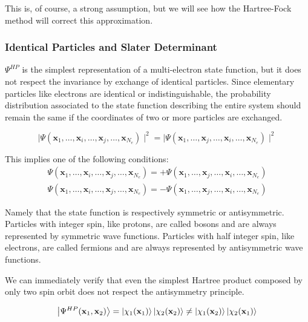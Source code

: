 \documentclass[a4paper,12pt]{article}
\begin{document}
This is, of course, a strong assumption, but we will see how the Hartree-Fock method will correct this approximation.



\subsubsection{Identical Particles and Slater Determinant}

$\Psi^{HP}$ is the simplest representation of a multi-electron state function, but it does not respect the invariance by exchange of identical particles.
Since elementary particles like electrons are identical or indistinguishable, the probability distribution associated to the state function describing the entire system should remain the same if the coordinates of two or more particles are exchanged.

\begin{equation}
	\mid \Psi(\mathbf{x}_1,\dots,\mathbf{x}_i,\dots,\mathbf{x}_j,\dots,\mathbf{x}_{N_e}) \mid^2 = \mid \Psi(\mathbf{x}_1,\dots,\mathbf{x}_j,\dots,\mathbf{x}_i,\dots,\mathbf{x}_{N_e}) \mid^2
\end{equation}

This implies one of the following conditions:
\begin{align}
	\Psi(\mathbf{x}_1,\dots,\mathbf{x}_i,\dots,\mathbf{x}_j,\dots,\mathbf{x}_{N_e}) = 
		+\Psi(\mathbf{x}_1,\dots,\mathbf{x}_j,\dots,\mathbf{x}_i,\dots,\mathbf{x}_{N_e})\\
	\Psi(\mathbf{x}_1,\dots,\mathbf{x}_i,\dots,\mathbf{x}_j,\dots,\mathbf{x}_{N_e}) = 
		-\Psi(\mathbf{x}_1,\dots,\mathbf{x}_j,\dots,\mathbf{x}_i,\dots,\mathbf{x}_{N_e}) 
\end{align}

Namely that the state function is respectively symmetric or antisymmetric.
Particles with integer spin, like protons, are called bosons and are always represented by symmetric wave functions.
Particles with half integer spin, like electrons, are called fermions and are always represented by antisymmetric wave functions.

We can immediately verify that even the simplest Hartree product composed by only two spin orbit does not respect the antisymmetry principle.

\begin{equation*}
	\ket{\Psi^{HP}(\mathbf{x}_1,\mathbf{x}_2)} = \ket{\chi_1(\mathbf{x}_1)} \ket{\chi_2(\mathbf{x}_2)} \neq \ket{\chi_1(\mathbf{x}_2)} \ket{\chi_2(\mathbf{x}_1)}
\end{equation*}
\end{document}
